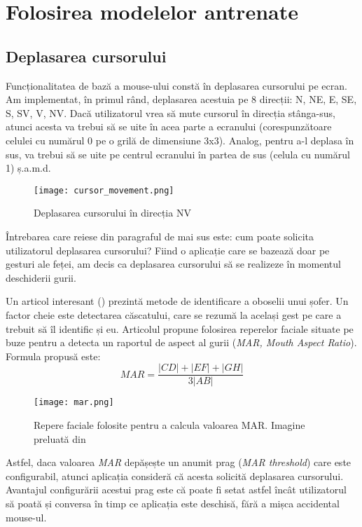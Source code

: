 \chapter{Folosirea modelelor antrenate}
\label{chapter5}
\section{Deplasarea cursorului}
Funcționalitatea de bază a mouse-ului constă în deplasarea cursorului pe ecran.
Am implementat, în primul rând, deplasarea acestuia pe 8 direcții: N, NE, E, SE, S, SV, V, NV.
Dacă utilizatorul vrea să mute cursorul în direcția stânga-sus, atunci acesta va trebui să se uite în acea parte a ecranului (corespunzătoare celulei cu numărul 0 pe o grilă de dimensiune 3x3).
Analog, pentru a-l deplasa în sus, va trebui să se uite pe centrul ecranului în partea de sus (celula cu numărul 1) ș.a.m.d.

\begin{figure}[H]
    \centering
    \texttt{[image: cursor\_movement.png]}
    \caption{Deplasarea cursorului în direcția NV}
\end{figure}

Întrebarea care reiese din paragraful de mai sus este: cum poate solicita utilizatorul deplasarea cursorului?
Fiind o aplicație care se bazează doar pe gesturi ale feței, am decis ca deplasarea cursorului să se realizeze în momentul deschiderii gurii.

Un articol interesant (\cite{driver_drowsiness}) prezintă metode de identificare a oboselii unui șofer.
Un factor cheie este detectarea căscatului, care se rezumă la același gest pe care a trebuit să îl identific și eu.
Articolul propune folosirea reperelor faciale situate pe buze pentru a detecta un raportul de aspect al gurii (\emph{MAR, Mouth Aspect Ratio}).
Formula propusă este:
$$MAR = \frac{|CD| + |EF| + |GH|}{3|AB|}$$

\begin{figure}[H]
    \centering
    \texttt{[image: mar.png]}
    \caption{Repere faciale folosite pentru a calcula valoarea MAR. Imagine preluată din \cite{driver_drowsiness}}
\end{figure}

Astfel, daca valoarea \emph{MAR} depășește un anumit prag (\emph{MAR threshold}) care este configurabil, atunci aplicația consideră că acesta solicită deplasarea cursorului.
Avantajul configurării acestui prag este că poate fi setat astfel încât utilizatorul să poată și conversa în timp ce aplicația este deschisă, fără a mișca accidental mouse-ul.

